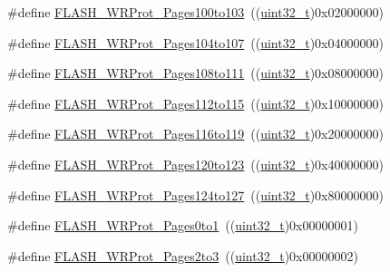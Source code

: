 \begin{DoxyCompactItemize}
\item 
\#define \hyperlink{group___option___bytes___write___protection_ga0c03cee6931c623ccdaae19233c81f4e}{F\+L\+A\+S\+H\+\_\+\+W\+R\+Prot\+\_\+\+Pages100to103}~((\hyperlink{_p_e___types_8h_a33594304e786b158f3fb30289278f5af}{uint32\+\_\+t})0x02000000)
\item 
\#define \hyperlink{group___option___bytes___write___protection_ga2e096d51e61a972c97093110211b3be5}{F\+L\+A\+S\+H\+\_\+\+W\+R\+Prot\+\_\+\+Pages104to107}~((\hyperlink{_p_e___types_8h_a33594304e786b158f3fb30289278f5af}{uint32\+\_\+t})0x04000000)
\item 
\#define \hyperlink{group___option___bytes___write___protection_ga899e34df1ab5369d840461686eb9c318}{F\+L\+A\+S\+H\+\_\+\+W\+R\+Prot\+\_\+\+Pages108to111}~((\hyperlink{_p_e___types_8h_a33594304e786b158f3fb30289278f5af}{uint32\+\_\+t})0x08000000)
\item 
\#define \hyperlink{group___option___bytes___write___protection_gacd2d5839240b77f70be15e76086745ab}{F\+L\+A\+S\+H\+\_\+\+W\+R\+Prot\+\_\+\+Pages112to115}~((\hyperlink{_p_e___types_8h_a33594304e786b158f3fb30289278f5af}{uint32\+\_\+t})0x10000000)
\item 
\#define \hyperlink{group___option___bytes___write___protection_ga1283655c7c974e0de142cec7921c8673}{F\+L\+A\+S\+H\+\_\+\+W\+R\+Prot\+\_\+\+Pages116to119}~((\hyperlink{_p_e___types_8h_a33594304e786b158f3fb30289278f5af}{uint32\+\_\+t})0x20000000)
\item 
\#define \hyperlink{group___option___bytes___write___protection_gac8d2f42123810fefc68572709d8830ec}{F\+L\+A\+S\+H\+\_\+\+W\+R\+Prot\+\_\+\+Pages120to123}~((\hyperlink{_p_e___types_8h_a33594304e786b158f3fb30289278f5af}{uint32\+\_\+t})0x40000000)
\item 
\#define \hyperlink{group___option___bytes___write___protection_gae6e70db5200b52248c9ec4293ff9890e}{F\+L\+A\+S\+H\+\_\+\+W\+R\+Prot\+\_\+\+Pages124to127}~((\hyperlink{_p_e___types_8h_a33594304e786b158f3fb30289278f5af}{uint32\+\_\+t})0x80000000)
\item 
\#define \hyperlink{group___option___bytes___write___protection_ga7dfbb58b90b63afef11bfcf7a8f109e2}{F\+L\+A\+S\+H\+\_\+\+W\+R\+Prot\+\_\+\+Pages0to1}~((\hyperlink{_p_e___types_8h_a33594304e786b158f3fb30289278f5af}{uint32\+\_\+t})0x00000001)
\item 
\#define \hyperlink{group___option___bytes___write___protection_gaeeb592e66053dde68ebb3ff3926d033d}{F\+L\+A\+S\+H\+\_\+\+W\+R\+Prot\+\_\+\+Pages2to3}~((\hyperlink{_p_e___types_8h_a33594304e786b158f3fb30289278f5af}{uint32\+\_\+t})0x00000002)

\end{DoxyCompactItemize}
